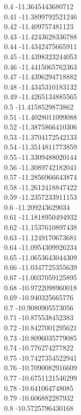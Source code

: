 {0.4	-11.3645443680712\\
0.41	-11.3899792521246\\
0.42	-11.409757481123\\
0.43	-11.4243628336788\\
0.44	-11.4342475665911\\
0.45	-11.4398323244053\\
0.46	-11.4415065762363\\
0.47	-11.4396294718882\\
0.48	-11.4345310183132\\
0.49	-11.4265134885565\\
0.5	-11.4158529873862\\
0.51	-11.4028011099088\\
0.52	-11.3875866410306\\
0.53	-11.3704172542133\\
0.54	-11.3514811773859\\
0.55	-11.3309488020144\\
0.56	-11.3089742182041\\
0.57	-11.2856966643874\\
0.58	-11.2612418847422\\
0.59	-11.2357233911153\\
0.6	-11.209243629034\\
0.61	-11.1818950494932\\
0.62	-11.1537610897438\\
0.63	-11.1249170673681\\
0.64	-11.0954309926234\\
0.65	-11.0653643044309\\
0.66	-11.0347725355639\\
0.67	-11.0037059125895\\
0.68	-10.9722098960018\\
0.69	-10.940325665776\\
0.7	-10.9080905573056\\
0.71	-10.875538452383\\
0.72	-10.8427001295621\\
0.73	-10.8096035779085\\
0.74	-10.776274277822\\
0.75	-10.7427354522941\\
0.76	-10.7090082916609\\
0.77	-10.6751121546299\\
0.78	-10.641064748085\\
0.79	-10.606882287932\\
0.8	-10.5725796430168\\
}
